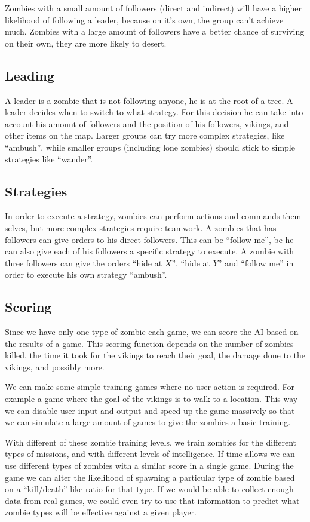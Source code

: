 Zombies with a small amount of followers (direct and indirect) will have a higher likelihood of following a leader, because on it's own, the group can't achieve much. Zombies with a large amount of followers have a better chance of surviving on their own, they are more likely to desert.

\subsection{Leading}
A leader is a zombie that is not following anyone, he is at the root of a tree. A leader decides when to switch to what strategy. For this decision he can take into account his amount of followers and the position of his followers, vikings, and other items on the map. Larger groups can try more complex strategies, like ``ambush'', while smaller groups (including lone zombies) should stick to simple strategies like ``wander''.

\subsection{Strategies}
In order to execute a strategy, zombies can perform actions and commands them selves, but more complex strategies require teamwork. A zombies that has followers can give orders to his direct followers. This can be ``follow me'', be he can also give each of his followers a specific strategy to execute. A zombie with three followers can give the orders ``hide at $X$'', ``hide at $Y$'' and ``follow me'' in order to execute his own strategy ``ambush''.

\subsection{Scoring}
Since we have only one type of zombie each game, we can score the AI based on the results of a game. This scoring function depends on the number of zombies killed, the time it took for the vikings to reach their goal, the damage done to the vikings, and possibly more.

We can make some simple training games where no user action is required. For example a game where the goal of the vikings is to walk to a location. This way we can disable user input and output and speed up the game massively so that we can simulate a large amount of games to give the zombies a basic training.

With different of these zombie training levels, we train zombies for the different types of missions, and with different levels of intelligence. If time allows we can use different types of zombies with a similar score in a single game. During the game we can alter the likelihood of spawning a particular type of zombie based on a ``kill/death''-like ratio for that type. If we would be able to collect enough data from real games, we could even try to use that information to predict what zombie types will be effective against a given player.

\FloatBarrier